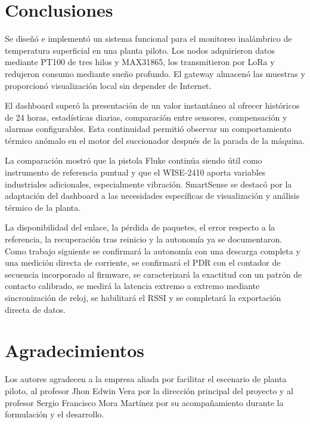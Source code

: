 \documentclass[conference]{IEEEtran}
\begin{document}
\section{Conclusiones}

Se diseñó e implementó un sistema funcional para el monitoreo inalámbrico de temperatura superficial en una planta piloto. Los nodos adquirieron datos mediante PT100 de tres hilos y MAX31865, los transmitieron por LoRa y redujeron consumo mediante sueño profundo. El gateway almacenó las muestras y proporcionó visualización local sin depender de Internet.

El dashboard superó la presentación de un valor instantáneo al ofrecer históricos de 24 horas, estadísticas diarias, comparación entre sensores, compensación y alarmas configurables. Esta continuidad permitió observar un comportamiento térmico anómalo en el motor del succionador después de la parada de la máquina.

La comparación mostró que la pistola Fluke continúa siendo útil como instrumento de referencia puntual y que el WISE-2410 aporta variables industriales adicionales, especialmente vibración. SmartSense se destacó por la adaptación del dashboard a las necesidades específicas de visualización y análisis térmico de la planta.

La disponibilidad del enlace, la pérdida de paquetes, el error respecto a la referencia, la recuperación tras reinicio y la autonomía ya se documentaron. Como trabajo siguiente se confirmará la autonomía con una descarga completa y una medición directa de corriente, se confirmará el PDR con el contador de secuencia incorporado al firmware, se caracterizará la exactitud con un patrón de contacto calibrado, se medirá la latencia extremo a extremo mediante sincronización de reloj, se habilitará el RSSI y se completará la exportación directa de datos.

\section*{Agradecimientos}

Los autores agradecen a la empresa aliada por facilitar el escenario de planta piloto, al profesor Jhon Edwin Vera por la dirección principal del proyecto y al profesor Sergio Francisco Mora Martínez por su acompañamiento durante la formulación y el desarrollo.
\end{document}
